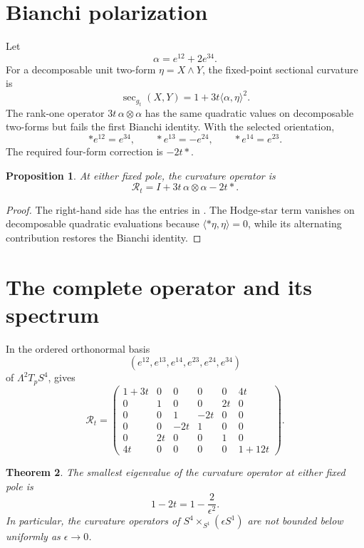 \documentclass[10pt,reqno]{amsart}
\newtheorem{theorem}{Theorem}[section]
\newtheorem{proposition}[theorem]{Proposition}
\theoremstyle{definition}
\begin{document}
\section{Bianchi polarization}

Let
\[
 \alpha=e^{12}+2e^{34}.
\]
For a decomposable unit two-form \(\eta=X\wedge Y\), the fixed-point
sectional curvature is
\[
 \sec_{g_t}(X,Y)
 =1+3t\langle\alpha,\eta\rangle^2.
\]
The rank-one operator \(3t\,\alpha\otimes\alpha\) has the same quadratic
values on decomposable two-forms but fails the first Bianchi identity.  With
the selected orientation,
\[
 *e^{12}=e^{34},\qquad
 *e^{13}=-e^{24},\qquad
 *e^{14}=e^{23}.
\]
The required four-form correction is \(-2t*\).

\begin{proposition}\label{prop:operator}
At either fixed pole, the curvature operator is
\[
 \mathcal R_t
 =I+3t\,\alpha\otimes\alpha-2t*.
\]
\end{proposition}

\begin{proof}
The right-hand side has the entries in .  The Hodge-star
term vanishes on decomposable quadratic evaluations because
\(\langle*\eta,\eta\rangle=0\), while its alternating contribution restores
the Bianchi identity.
\end{proof}

\section{The complete operator and its spectrum}

In the ordered orthonormal basis
\[
 (e^{12},e^{13},e^{14},e^{23},e^{24},e^{34})
\]
of \(\Lambda^2T_pS^4\),  gives
\begin{equation}\label{eq:matrix}
\mathcal R_t=
\begin{pmatrix}
1+3t&0&0&0&0&4t\\
0&1&0&0&2t&0\\
0&0&1&-2t&0&0\\
0&0&-2t&1&0&0\\
0&2t&0&0&1&0\\
4t&0&0&0&0&1+12t
\end{pmatrix}.
\end{equation}

\begin{theorem}\label{thm:main}
The smallest eigenvalue of the curvature operator at either fixed pole is
\[
 1-2t=1-\frac{2}{\epsilon^2}.
\]
In particular, the curvature operators of
\(S^4\times_{S^1}(\epsilon S^1)\) are not bounded below uniformly as
\(\epsilon\to0\).
\end{theorem}
\end{document}
